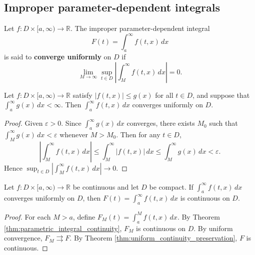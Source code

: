 \subsection{Improper parameter-dependent integrals}

\begin{definition}\label{def:uniform_improper_integral}
Let $f: D \times [a, \infty) \to \mathbb{R}$. The improper parameter-dependent integral
\[
F(t) = \int_a^{\infty} f(t, x) \, dx
\]
is said to \textbf{converge uniformly} on $D$ if
\[
\lim_{M \to \infty} \sup_{t \in D} \left| \int_M^{\infty} f(t, x) \, dx \right| = 0.
\]
\end{definition}

\begin{theorem}\label{thm:improper_m_test}
Let $f: D \times [a, \infty) \to \mathbb{R}$ satisfy $|f(t, x)| \le g(x)$ for all $t \in D$, and suppose that $\int_a^{\infty} g(x) \, dx < \infty$. Then $\int_a^{\infty} f(t, x) \, dx$ converges uniformly on $D$.
\end{theorem}

\begin{proof}
Given $\varepsilon > 0$. Since $\int_a^{\infty} g(x) \, dx$ converges, there exists $M_0$ such that $\int_M^{\infty} g(x) \, dx < \varepsilon$ whenever $M > M_0$. Then for any $t \in D$,
\[
\left| \int_M^{\infty} f(t, x) \, dx \right| \le \int_M^{\infty} |f(t, x)| \, dx \le \int_M^{\infty} g(x) \, dx < \varepsilon.
\]
Hence $\sup_{t \in D} |\int_M^{\infty} f(t, x) \, dx| \to 0$.
\end{proof}

\begin{theorem}\label{thm:improper_integral_continuity}
Let $f: D \times [a, \infty) \to \mathbb{R}$ be continuous and let $D$ be compact. If $\int_a^{\infty} f(t, x) \, dx$ converges uniformly on $D$, then $F(t) = \int_a^{\infty} f(t, x) \, dx$ is continuous on $D$.
\end{theorem}

\begin{proof}
For each $M > a$, define $F_M(t) = \int_a^M f(t, x) \, dx$. By Theorem \ref{thm:parametric_integral_continuity}, $F_M$ is continuous on $D$. By uniform convergence, $F_M \rightrightarrows F$. By Theorem \ref{thm:uniform_continuity_preservation}, $F$ is continuous.
\end{proof}

